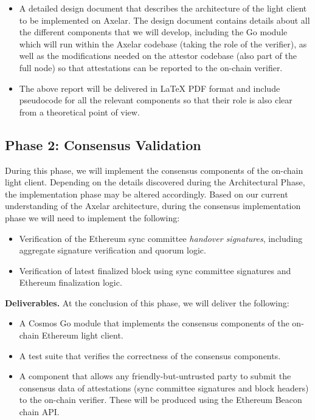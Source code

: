 \begin{itemize}
  \item A detailed design document that describes the architecture of the light client to be implemented on Axelar. The design document contains details about all the different components that we will develop, including the Go module which will run within the Axelar codebase (taking the role of the verifier), as well as the modifications needed on the attestor codebase (also part of the full node) so that attestations can be reported to the on-chain verifier.
  \item The above report will be delivered in LaTeX PDF format and include pseudocode for all the relevant components so that their role is also clear from a theoretical point of view.
\end{itemize}

\subsection{Phase 2: Consensus Validation}

During this phase, we will implement the consensus components of the on-chain light client. Depending on the details discovered during the Architectural Phase, the implementation phase may be altered accordingly. Based on our current understanding of the Axelar architecture, during the consensus implementation phase we will need to implement the following:

\begin{itemize}
  \item Verification of the Ethereum sync committee \emph{handover signatures}, including aggregate signature verification and quorum logic.
  \item Verification of latest finalized block using sync committee signatures and Ethereum finalization logic.
\end{itemize}

\noindent
\textbf{Deliverables.} At the conclusion of this phase, we will deliver the following:

\begin{itemize}
  \item A Cosmos Go module that implements the consensus components of the on-chain Ethereum light client.
  \item A test suite that verifies the correctness of the consensus components.
  \item A component that allows any friendly-but-untrusted party to submit the consensus data of attestations (sync committee signatures and block headers) to the on-chain verifier. These will be produced using the Ethereum Beacon chain API.
\end{itemize}


